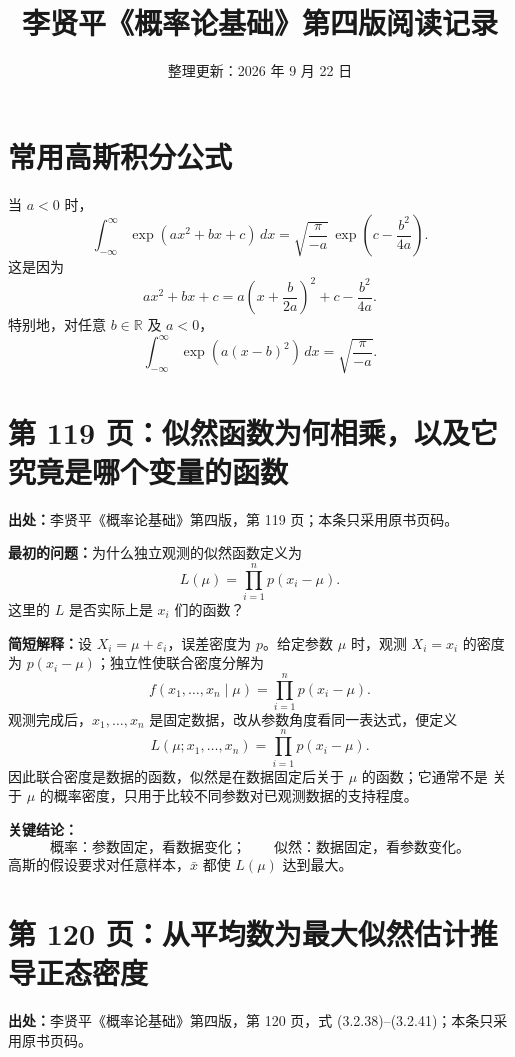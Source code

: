 \documentclass[UTF8,a4paper,11pt]{ctexart}
\title{李贤平《概率论基础》第四版阅读记录}
\author{}
\date{整理更新：2026 年 9 月 22 日}
\begin{document}
\maketitle
\vspace{-2em}

\section*{常用高斯积分公式}
当 $a<0$ 时，
\[
\int_{-\infty}^{\infty} \exp\!\left(ax^2+bx+c\right)\,dx
=\sqrt{\frac{\pi}{-a}}\,
 \exp\!\left(c-\frac{b^2}{4a}\right).
\]
这是因为
\[
ax^2+bx+c
=a\left(x+\frac{b}{2a}\right)^2+c-\frac{b^2}{4a}.
\]
特别地，对任意 $b\in\mathbb{R}$ 及 $a<0$，
\[
\int_{-\infty}^{\infty}\exp\!\left(a(x-b)^2\right)\,dx
=\sqrt{\frac{\pi}{-a}}.
\]

\section{第 119 页：似然函数为何相乘，以及它究竟是哪个变量的函数}
\label{note:probability-p119-likelihood-view}
\textbf{出处：}李贤平《概率论基础》第四版，第 119 页；本条只采用原书页码。

\textbf{最初的问题：}为什么独立观测的似然函数定义为
\[
L(\mu)=\prod_{i=1}^n p(x_i-\mu) .
\]
这里的 $L$ 是否实际上是 $x_i$ 们的函数？

\textbf{简短解释：}设 $X_i=\mu+\varepsilon_i$，误差密度为 $p$。给定参数
$\mu$ 时，观测 $X_i=x_i$ 的密度为 $p(x_i-\mu)$；独立性使联合密度分解为
\[
f(x_1,\ldots,x_n\mid\mu)=\prod_{i=1}^n p(x_i-\mu).
\]
观测完成后，$x_1,\ldots,x_n$ 是固定数据，改从参数角度看同一表达式，便定义
\[
L(\mu;x_1,\ldots,x_n)=\prod_{i=1}^n p(x_i-\mu).
\]
因此联合密度是数据的函数，似然是在数据固定后关于 $\mu$ 的函数；它通常不是
关于 $\mu$ 的概率密度，只用于比较不同参数对已观测数据的支持程度。

\textbf{关键结论：}
\[
\text{概率：参数固定，看数据变化；}\qquad
\text{似然：数据固定，看参数变化。}
\]
高斯的假设要求对任意样本，$\bar x$ 都使 $L(\mu)$ 达到最大。

\newpage
\section{第 120 页：从平均数为最大似然估计推导正态密度}
\label{note:probability-p120-gaussian-derivation}
\textbf{出处：}李贤平《概率论基础》第四版，第 120 页，式 (3.2.38)--(3.2.41)；本条只采用原书页码。
\end{document}
